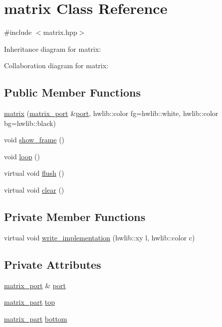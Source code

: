 \hypertarget{classmatrix}{}\section{matrix Class Reference}
\label{classmatrix}


{\ttfamily \#include $<$matrix.\+hpp$>$}



Inheritance diagram for matrix\+:


Collaboration diagram for matrix\+:
\subsection*{Public Member Functions}
\begin{DoxyCompactItemize}
\item 
\hyperlink{classmatrix_a5b188e2d48833305f8a1b6db34e40521}{matrix} (\hyperlink{classmatrix__port}{matrix\+\_\+port} \&\hyperlink{classmatrix_a41ef5702ec1ac3c3e23d6fe12ad58c57}{port}, hwlib\+::color fg=hwlib\+::white, hwlib\+::color bg=hwlib\+::black)
\item 
void \hyperlink{classmatrix_a2d1d88257855bff38c7359e183e26e43}{show\+\_\+frame} ()
\item 
void \hyperlink{classmatrix_a6d2edd1ca96668aed4dfa402fb558d8c}{loop} ()
\item 
virtual void \hyperlink{classmatrix_a867830c5b26171d0b031aadeb8ad1eee}{flush} ()
\item 
virtual void \hyperlink{classmatrix_a58f399a7e96f56100491d6d8ad235f68}{clear} ()
\end{DoxyCompactItemize}
\subsection*{Private Member Functions}
\begin{DoxyCompactItemize}
\item 
virtual void \hyperlink{classmatrix_a81034d9b2d1b26438be9861e837a962b}{write\+\_\+implementation} (hwlib\+::xy l, hwlib\+::color c)
\end{DoxyCompactItemize}
\subsection*{Private Attributes}
\begin{DoxyCompactItemize}
\item 
\hyperlink{classmatrix__port}{matrix\+\_\+port} \& \hyperlink{classmatrix_a41ef5702ec1ac3c3e23d6fe12ad58c57}{port}
\item 
\hyperlink{classmatrix__part}{matrix\+\_\+part} \hyperlink{classmatrix_ada4fc9c5734e5c7b27fe525bae27be7c}{top}
\item 
\hyperlink{classmatrix__part}{matrix\+\_\+part} \hyperlink{classmatrix_a8a571e0a29b41e59f71d851fa3dfc227}{bottom}
\end{DoxyCompactItemize}
